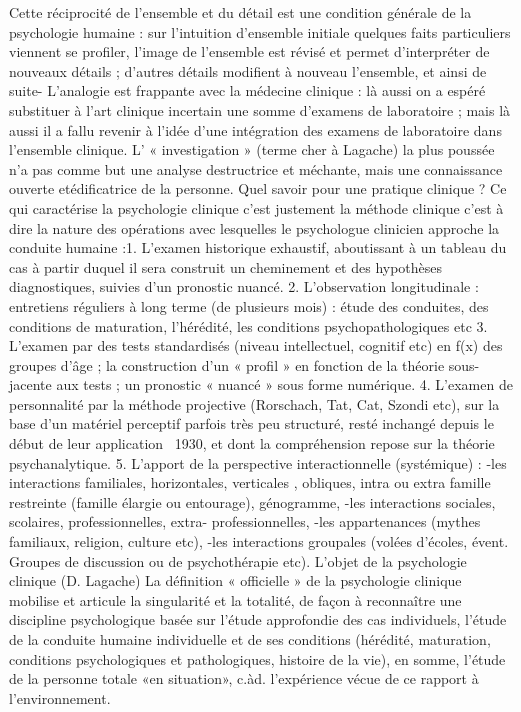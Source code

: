 Cette réciprocité de l’ensemble et du détail est une condition générale de la psychologie humaine : sur l’intuition d’ensemble initiale quelques faits particuliers viennent se profiler, l’image de l’ensemble est révisé et permet d’interpréter de nouveaux détails ; d’autres détails modifient à nouveau l’ensemble, et ainsi de suite-
L’analogie est frappante avec la médecine clinique : là aussi on a espéré substituer à l’art clinique incertain une somme d’examens de laboratoire ; mais là aussi il a fallu revenir à l’idée d’une intégration des examens de laboratoire dans l’ensemble clinique.
L’ « investigation » (terme cher à Lagache) la plus poussée n’a pas comme but une analyse destructrice et méchante, mais une connaissance ouverte etédificatrice de la personne. Quel savoir pour une pratique clinique ? Ce qui caractérise la psychologie clinique c’est justement la méthode clinique c’est à dire la nature des opérations avec lesquelles le psychologue clinicien approche la conduite humaine :1. L’examen historique exhaustif, aboutissant à un tableau du cas à partir duquel il sera construit un cheminement et des hypothèses diagnostiques, suivies d’un pronostic nuancé.
2. L’observation longitudinale : entretiens réguliers à long terme (de plusieurs mois) : étude des conduites, des conditions de maturation, l’hérédité, les conditions psychopathologiques etc
3. L’examen par des tests standardisés (niveau intellectuel, cognitif etc) en f(x) des groupes d’âge ; la construction d’un « profil » en fonction de la théorie sous-jacente aux tests ; un pronostic « nuancé » sous forme numérique.
4. L’examen de personnalité par la méthode projective (Rorschach, Tat, Cat, Szondi etc), sur la base d’un matériel perceptif parfois très peu structuré, resté inchangé depuis le début de leur application ~1930, et dont la compréhension repose sur la théorie psychanalytique.
5. L’apport de la perspective interactionnelle (systémique) :
-les interactions familiales, horizontales, verticales , obliques, intra ou extra famille restreinte (famille élargie ou entourage), génogramme,
-les interactions sociales, scolaires, professionnelles, extra- professionnelles, -les appartenances (mythes familiaux, religion, culture etc),
-les interactions groupales (volées d’écoles, évent. Groupes de discussion ou
de psychothérapie etc).
L’objet de la psychologie clinique (D. Lagache)
La définition « officielle » de la psychologie clinique mobilise et articule la singularité et
la totalité, de façon à reconnaître une discipline psychologique basée sur l’étude approfondie des cas individuels, l’étude de la conduite humaine individuelle et de ses conditions (hérédité, maturation, conditions psychologiques et pathologiques, histoire de la vie), en somme, l’étude de la personne totale «en situation», c.àd. l’expérience vécue de ce rapport à l’environnement.
